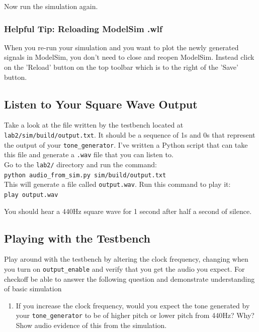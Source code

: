 \documentclass[11pt]{article}
\begin{document}
Now run the simulation again.

\subsubsection{Helpful Tip: Reloading ModelSim .wlf}

When you re-run your simulation and you want to plot the newly generated signals in ModelSim, you don't need to close and reopen ModelSim. Instead click on the 'Reload' button on the top toolbar which is to the right of the 'Save' button.

\subsection{Listen to Your Square Wave Output}

Take a look at the file written by the testbench located at \verb|lab2/sim/build/output.txt|. It should be a sequence of 1s and 0s that represent the output of your \verb|tone_generator|. I've written a Python script that can take this file and generate a \verb|.wav| file that you can listen to.\\

Go to the \verb|lab2/| directory and run the command:\\

\verb|python audio_from_sim.py sim/build/output.txt|\\

This will generate a file called \verb|output.wav|. Run this command to play it:\\

\verb|play output.wav|

You should hear a 440Hz square wave for 1 second after half a second of silence.

\subsection{Playing with the Testbench}

Play around with the testbench by altering the clock frequency, changing when you turn on \verb|output_enable| and verify that you get the audio you expect. For checkoff be able to answer the following question and demonstrate understanding of basic simulation

\begin{enumerate}
	\item If you increase the clock frequency, would you expect the tone generated by your \verb|tone_generator| to be of higher pitch or lower pitch from 440Hz? Why? Show audio evidence of this from the simulation.
\end{enumerate}
\end{document}
